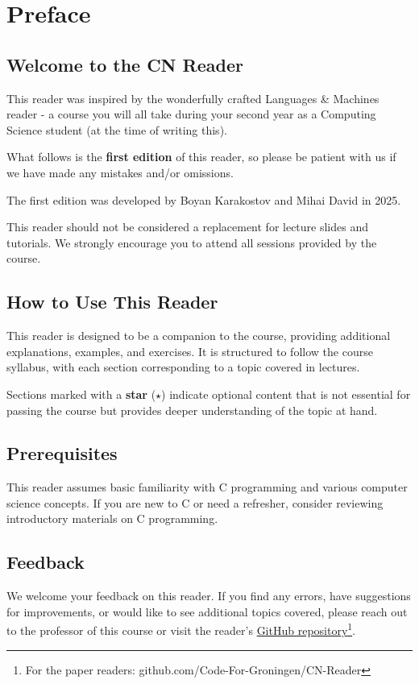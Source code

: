 \chapter{Preface}
\section*{Welcome to the CN Reader}
This reader was inspired by the wonderfully crafted Languages \& Machines reader - a course you will all take during your second year as a Computing Science student (at the time of writing this).

What follows is the \textbf{first edition} of this reader, so please be patient with us if we have made any mistakes and/or omissions.

The first edition was developed by Boyan Karakostov and Mihai David in 2025.

\begin{warningblock}
This reader should not be considered a replacement for lecture slides and tutorials. We strongly encourage you to attend all sessions provided by the course.
\end{warningblock}

\section*{How to Use This Reader}
This reader is designed to be a companion to the course, providing additional explanations, examples, and exercises. It is structured to follow the course syllabus, with each section corresponding to a topic covered in lectures.

Sections marked with a \textbf{star} ($\star$) indicate optional content that is not essential for passing the course but provides deeper understanding of the topic at hand.

\section*{Prerequisites}
This reader assumes basic familiarity with C programming and various computer science concepts. If you are new to C or need a refresher, consider reviewing introductory materials on C programming.

\section*{Feedback}
We welcome your feedback on this reader. If you find any errors, have suggestions for improvements, or would like to see additional topics covered, please reach out to the professor of this course or visit the reader's \href{https://github.com/Code-For-Groningen/CN-Reader}{GitHub repository}\footnote{For the paper readers: github.com/Code-For-Groningen/CN-Reader}.

